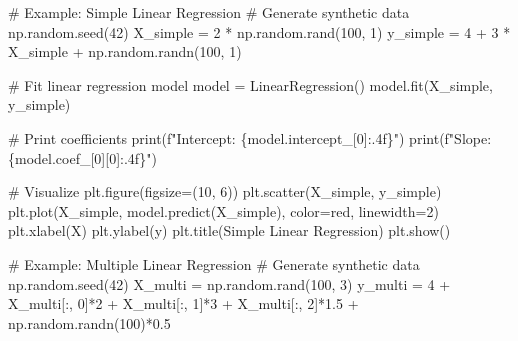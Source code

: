 \documentclass[
  letterpaper,
  DIV=11,
  numbers=noendperiod]{scrreprt}
\newenvironment{Shaded}{\begin{snugshade}}{\end{snugshade}}
\newcommand{\BuiltInTok}[1]{\textcolor[rgb]{0.00,0.23,0.31}{#1}}
\newcommand{\CommentTok}[1]{\textcolor[rgb]{0.37,0.37,0.37}{#1}}
\newcommand{\DecValTok}[1]{\textcolor[rgb]{0.68,0.00,0.00}{#1}}
\newcommand{\FloatTok}[1]{\textcolor[rgb]{0.68,0.00,0.00}{#1}}
\newcommand{\NormalTok}[1]{\textcolor[rgb]{0.00,0.23,0.31}{#1}}
\newcommand{\OperatorTok}[1]{\textcolor[rgb]{0.37,0.37,0.37}{#1}}
\newcommand{\SpecialCharTok}[1]{\textcolor[rgb]{0.37,0.37,0.37}{#1}}
\newcommand{\SpecialStringTok}[1]{\textcolor[rgb]{0.13,0.47,0.30}{#1}}
\newcommand{\StringTok}[1]{\textcolor[rgb]{0.13,0.47,0.30}{#1}}
\begin{document}
\begin{Shaded}
\begin{Highlighting}[]
\CommentTok{\# Example: Simple Linear Regression}
\CommentTok{\# Generate synthetic data}
\NormalTok{np.random.seed(}\DecValTok{42}\NormalTok{)}
\NormalTok{X\_simple }\OperatorTok{=} \DecValTok{2} \OperatorTok{*}\NormalTok{ np.random.rand(}\DecValTok{100}\NormalTok{, }\DecValTok{1}\NormalTok{)}
\NormalTok{y\_simple }\OperatorTok{=} \DecValTok{4} \OperatorTok{+} \DecValTok{3} \OperatorTok{*}\NormalTok{ X\_simple }\OperatorTok{+}\NormalTok{ np.random.randn(}\DecValTok{100}\NormalTok{, }\DecValTok{1}\NormalTok{)}

\CommentTok{\# Fit linear regression model}
\NormalTok{model }\OperatorTok{=}\NormalTok{ LinearRegression()}
\NormalTok{model.fit(X\_simple, y\_simple)}

\CommentTok{\# Print coefficients}
\BuiltInTok{print}\NormalTok{(}\SpecialStringTok{f"Intercept: }\SpecialCharTok{\{}\NormalTok{model}\SpecialCharTok{.}\NormalTok{intercept\_[}\DecValTok{0}\NormalTok{]}\SpecialCharTok{:.4f\}}\SpecialStringTok{"}\NormalTok{)}
\BuiltInTok{print}\NormalTok{(}\SpecialStringTok{f"Slope: }\SpecialCharTok{\{}\NormalTok{model}\SpecialCharTok{.}\NormalTok{coef\_[}\DecValTok{0}\NormalTok{][}\DecValTok{0}\NormalTok{]}\SpecialCharTok{:.4f\}}\SpecialStringTok{"}\NormalTok{)}

\CommentTok{\# Visualize}
\NormalTok{plt.figure(figsize}\OperatorTok{=}\NormalTok{(}\DecValTok{10}\NormalTok{, }\DecValTok{6}\NormalTok{))}
\NormalTok{plt.scatter(X\_simple, y\_simple)}
\NormalTok{plt.plot(X\_simple, model.predict(X\_simple), color}\OperatorTok{=}\StringTok{\textquotesingle{}red\textquotesingle{}}\NormalTok{, linewidth}\OperatorTok{=}\DecValTok{2}\NormalTok{)}
\NormalTok{plt.xlabel(}\StringTok{\textquotesingle{}X\textquotesingle{}}\NormalTok{)}
\NormalTok{plt.ylabel(}\StringTok{\textquotesingle{}y\textquotesingle{}}\NormalTok{)}
\NormalTok{plt.title(}\StringTok{\textquotesingle{}Simple Linear Regression\textquotesingle{}}\NormalTok{)}
\NormalTok{plt.show()}

\CommentTok{\# Example: Multiple Linear Regression}
\CommentTok{\# Generate synthetic data}
\NormalTok{np.random.seed(}\DecValTok{42}\NormalTok{)}
\NormalTok{X\_multi }\OperatorTok{=}\NormalTok{ np.random.rand(}\DecValTok{100}\NormalTok{, }\DecValTok{3}\NormalTok{)}
\NormalTok{y\_multi }\OperatorTok{=} \DecValTok{4} \OperatorTok{+}\NormalTok{ X\_multi[:, }\DecValTok{0}\NormalTok{]}\OperatorTok{*}\DecValTok{2} \OperatorTok{+}\NormalTok{ X\_multi[:, }\DecValTok{1}\NormalTok{]}\OperatorTok{*}\DecValTok{3} \OperatorTok{+}\NormalTok{ X\_multi[:, }\DecValTok{2}\NormalTok{]}\OperatorTok{*}\FloatTok{1.5} \OperatorTok{+}\NormalTok{ np.random.randn(}\DecValTok{100}\NormalTok{)}\OperatorTok{*}\FloatTok{0.5}


\end{Highlighting}
\end{Shaded}
\end{document}
